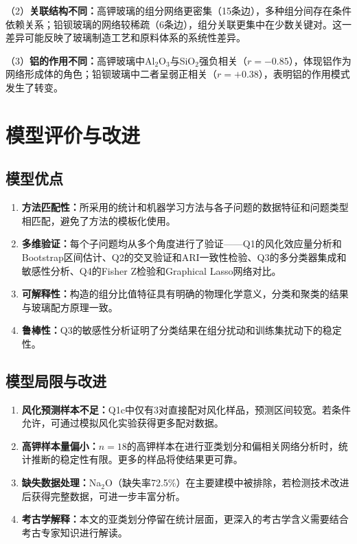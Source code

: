 \documentclass[fontset=windows, 12pt, a4paper]{ctexart}
\begin{document}
（2）\textbf{关联结构不同：}高钾玻璃的组分网络更密集（15条边），多种组分间存在条件依赖关系；铅钡玻璃的网络较稀疏（6条边），组分关联更集中在少数关键对。这一差异可能反映了玻璃制造工艺和原料体系的系统性差异。

（3）\textbf{铝的作用不同：}高钾玻璃中Al$_2$O$_3$与SiO$_2$强负相关（$r=-0.85$），体现铝作为网络形成体的角色；铅钡玻璃中二者呈弱正相关（$r=+0.38$），表明铝的作用模式发生了转变。

\newpage

\section{模型评价与改进}

\subsection{模型优点}

\begin{enumerate}
\item \textbf{方法匹配性：}所采用的统计和机器学习方法与各子问题的数据特征和问题类型相匹配，避免了方法的模板化使用。
\item \textbf{多维验证：}每个子问题均从多个角度进行了验证——Q1的风化效应量分析和Bootstrap区间估计、Q2的交叉验证和ARI一致性检验、Q3的多分类器集成和敏感性分析、Q4的Fisher Z检验和Graphical Lasso网络对比。
\item \textbf{可解释性：}构造的组分比值特征具有明确的物理化学意义，分类和聚类的结果与玻璃配方原理一致。
\item \textbf{鲁棒性：}Q3的敏感性分析证明了分类结果在组分扰动和训练集扰动下的稳定性。
\end{enumerate}

\subsection{模型局限与改进}

\begin{enumerate}
\item \textbf{风化预测样本不足：}Q1c中仅有3对直接配对风化样品，预测区间较宽。若条件允许，可通过模拟风化实验获得更多配对数据。
\item \textbf{高钾样本量偏小：}$n=18$的高钾样本在进行亚类划分和偏相关网络分析时，统计推断的稳定性有限。更多的样品将使结果更可靠。
\item \textbf{缺失数据处理：}Na$_2$O（缺失率72.5\%）在主要建模中被排除，若检测技术改进后获得完整数据，可进一步丰富分析。
\item \textbf{考古学解释：}本文的亚类划分停留在统计层面，更深入的考古学含义需要结合考古专家知识进行解读。
\end{enumerate}
\end{document}

